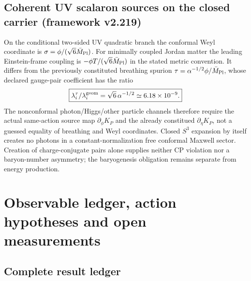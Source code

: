 \documentclass[12pt,a4paper]{article}
\begin{document}
\label{p7v2:part:integrated}

\subsection{Coherent UV scalaron sources on the closed carrier (framework v2.219)}
\label{p5c:sec:v2219-coherent-source}
On the conditional two-sided UV quadratic branch the conformal Weyl
coordinate is $\sigma=\phi/(\sqrt6\bar M_{\rm Pl})$.  For
minimally coupled Jordan matter the leading Einstein-frame coupling is
$-\phi T/(\sqrt6\bar M_{\rm Pl})$ in the stated metric convention.
It differs from the previously constituted breathing spurion
$\tau=\alpha^{-1/2}\phi/\bar M_{\rm Pl}$, whose declared gauge-pair
coefficient has the ratio
\[
 \boxed{\lambda_i^\tau/\lambda_i^{\rm geom}
 =\sqrt6\,\alpha^{-1/2}\simeq6.18\times10^{-9}.}
\]
The nonconformal photon/Higgs/other particle channels therefore require
the actual same-action source map $\partial_\phi K_P$ and the
already constitued $\partial_\eta K_P$, not a guessed equality of
breathing and Weyl coordinates.  Closed $S^3$ expansion by itself
creates no photons in a constant-normalization free conformal Maxwell
sector.  Creation of charge-conjugate pairs alone supplies neither CP
violation nor a baryon-number asymmetry; the baryogenesis obligation
remains separate from energy production.



\section{Observable ledger, action hypotheses and open measurements}
\label{p5c:sec:organized-results}
\subsection{Complete result ledger}
\label{p7v2:sec:result-ledger}
\end{document}

